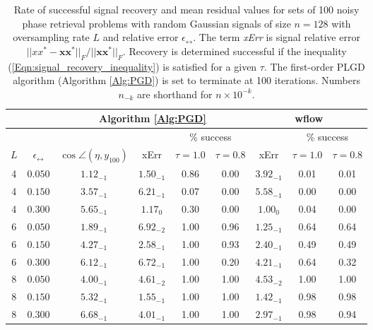 \begin{table}[H]
\centering
\begin{tabular}{ |cc|c|c|cc|c|cc| }
\hline
	\multicolumn{2}{|c|}{}
	&	\multicolumn{4}{c|}{Algorithm \ref{Alg:PGD}} 	
		&	\multicolumn{3}{c|}{wflow} 	  \\
 \hline
 	&&&&	\multicolumn{2}{c|}{\% success}
 				&&	\multicolumn{2}{c|}{\% success}	\\
$L$	&	$\epsilon_\rel$ 	&	$\cos \angle (\eta, y_{100})$ &  xErr &	$\tau= 1.0$ & $\tau= 0.8$	 & xErr &	$\tau= 1.0$ & $\tau= 0.8$	 \\
\hline
  4 & $0.050$ & $1.12_{-1}$ & $1.50_{-1}$ &  0.86 & 0.00 & $3.92_{-1}$ & 0.01 & 0.01	\\
  4 & $0.150$ & $3.57_{-1}$ & $6.21_{-1}$ &  0.07 & 0.00 & $5.58_{-1}$ & 0.00 & 0.00	\\
   4 & $0.300$ & $5.65_{-1}$ & $1.17_{0}$ &  0.30 & 0.00 & $1.00_{0}$ & 0.04 & 0.00	\\
\hline
  6 & $0.050$ & $1.89_{-1}$ & $6.92_{-2}$ &  1.00 & 0.96 & $1.25_{-1}$ & 0.64 & 0.64	\\
  6 & $0.150$ & $4.27_{-1}$ & $2.58_{-1}$ &  1.00 & 0.93 & $2.40_{-1}$ & 0.49 & 0.49	\\
  6 & $0.300$ & $6.12_{-1}$ & $6.72_{-1}$ &  1.00 & 0.20 & $4.21_{-1}$ & 0.64 & 0.32	\\
\hline
  8 & $0.050$ & $4.00_{-1}$ & $4.61_{-2}$ &  1.00 & 1.00 & $4.53_{-2}$ & 1.00 & 1.00	\\
  8 & $0.150$ & $5.32_{-1}$ & $1.55_{-1}$ &  1.00 & 1.00 & $1.42_{-1}$ & 0.98 & 0.98	\\
  8 & $0.300$ & $6.68_{-1}$ & $4.01_{-1}$ &  1.00 & 1.00 & $2.97_{-1}$ & 0.98 & 0.94	\\
\hline

\end{tabular}
\caption{Rate of successful signal recovery and mean residual values for sets of 100 noisy phase retrieval problems with random Gaussian signals of size $n = 128$ with oversampling rate $L$ and relative error $\epsilon_\rel$.  The term \textit{xErr} is signal relative error $||xx^*- \mathbf{x}\mathbf{x}^*||_F / ||\mathbf{x}\mathbf{x}^*||_F$.  Recovery is determined successful if the inequality (\ref{Eqn:signal_recovery_inequality}) is satisfied for a given $\tau$.  The first-order PLGD algorithm (Algorithm \ref{Alg:PGD}) is set to terminate at 100 iterations. Numbers $n_{-k}$ are shorthand for $n \times 10^{-k}$.} \label{Tab:relative_errors_saga_vs_wflow}
\end{table}  


